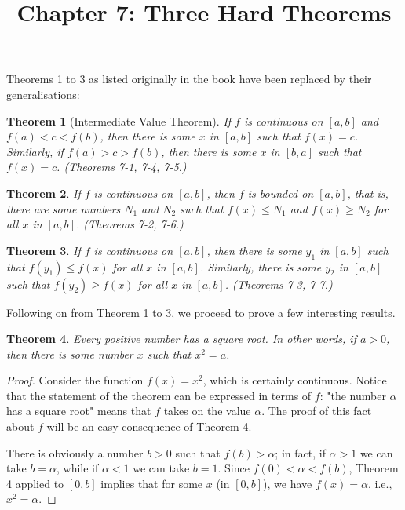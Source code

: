 \documentclass{article}
\newtheorem{theorem}{Theorem}
\begin{document}
\title{Chapter 7: Three Hard Theorems}
\maketitle

Theorems 1 to 3 as listed originally in the book have been replaced by their
generalisations:

\begin{theorem}[Intermediate Value Theorem]
  If $f$ is continuous on $[a, b]$ and $f(a) < c < f(b)$, then there is some
  $x$ in $[a, b]$ such that $f(x) = c$. Similarly, if $f(a) > c > f(b)$, then
  there is some $x$ in $[b, a]$ such that $f(x) = c$.
  (Theorems 7-1, 7-4, 7-5.)
\end{theorem}

\begin{theorem}
  If $f$ is continuous on $[a, b]$, then $f$ is bounded on $[a, b]$, that
  is, there are some numbers $N_1$ and $N_2$ such that $f(x) \leq N_1$ and
  $f(x) \geq N_2$ for all $x$ in $[a, b]$. (Theorems 7-2, 7-6.)
\end{theorem}

\begin{theorem}
  If $f$ is continuous on $[a, b]$, then there is some $y_1$ in $[a, b]$ such
  that $f(y_1) \leq f(x)$ for all $x$ in $[a, b]$. Similarly, there is some
  $y_2$ in $[a, b]$ such that $f(y_2) \geq f(x)$ for all $x$ in $[a, b]$.
  (Theorems 7-3, 7-7.)
\end{theorem}

Following on from Theorem 1 to 3, we proceed to prove a few interesting
results.

\setcounter{theorem}{7}
\begin{theorem}
  Every positive number has a square root. In other words, if $a > 0$, then
  there is some number $x$ such that $x^2 = a$.
\end{theorem}
\begin{proof}
  Consider the function $f(x) = x^2$, which is certainly continuous. Notice
  that the statement of the theorem can be expressed in terms of $f$: "the
  number $\alpha$ has a square root" means that $f$ takes on the value
  $\alpha$. The proof of this fact about $f$ will be an easy consequence of
  Theorem 4.

  There is obviously a number $b > 0$ such that $f(b) > \alpha$; in fact, if
  $\alpha > 1$ we can take $b = \alpha$, while if $\alpha < 1$ we can take $b =
  1$. Since $f(0) < \alpha < f(b)$, Theorem 4 applied to $[0, b]$ implies that
  for some $x$ (in $[0, b]$), we have $f(x) = \alpha$, i.e., $x^2 = \alpha$.
\end{proof}
\end{document}
